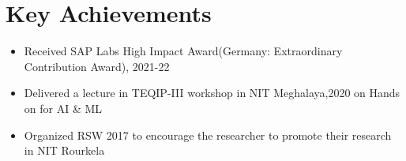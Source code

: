 \documentclass[a4paper,12pt]{article}
\begin{document}
\section{Key Achievements}
  \begin{itemize}[nosep,after=\strut, leftmargin=1em, itemsep=3pt]
    \item Received SAP Labs High Impact Award(Germany: Extraordinary Contribution Award), 2021-22
    \item Delivered a lecture in TEQIP-III workshop in NIT Meghalaya,2020 on Hands on for AI \& ML 
    \item Organized RSW 2017 to encourage the researcher to promote their research in NIT Rourkela
  \end{itemize}

\vfill
\end{document}
